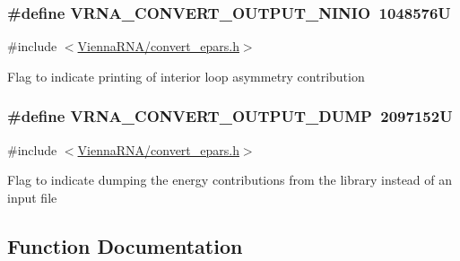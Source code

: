 \subsubsection[{V\+R\+N\+A\+\_\+\+C\+O\+N\+V\+E\+R\+T\+\_\+\+O\+U\+T\+P\+U\+T\+\_\+\+N\+I\+N\+I\+O}]{\setlength{\rightskip}{0pt plus 5cm}\#define V\+R\+N\+A\+\_\+\+C\+O\+N\+V\+E\+R\+T\+\_\+\+O\+U\+T\+P\+U\+T\+\_\+\+N\+I\+N\+I\+O~1048576\+U}\label{group__energy__parameters__convert_ga2eb0462f16939ddacdaf751a88d675ce}


{\ttfamily \#include $<$\hyperlink{convert__epars_8h}{Vienna\+R\+N\+A/convert\+\_\+epars.\+h}$>$}

Flag to indicate printing of interior loop asymmetry contribution \hypertarget{group__energy__parameters__convert_gac86976e9c2a55b3a6481ea60044f6098}{}
\subsubsection[{V\+R\+N\+A\+\_\+\+C\+O\+N\+V\+E\+R\+T\+\_\+\+O\+U\+T\+P\+U\+T\+\_\+\+D\+U\+M\+P}]{\setlength{\rightskip}{0pt plus 5cm}\#define V\+R\+N\+A\+\_\+\+C\+O\+N\+V\+E\+R\+T\+\_\+\+O\+U\+T\+P\+U\+T\+\_\+\+D\+U\+M\+P~2097152\+U}\label{group__energy__parameters__convert_gac86976e9c2a55b3a6481ea60044f6098}


{\ttfamily \#include $<$\hyperlink{convert__epars_8h}{Vienna\+R\+N\+A/convert\+\_\+epars.\+h}$>$}

Flag to indicate dumping the energy contributions from the library instead of an input file 

\subsection{Function Documentation}
\hypertarget{group__energy__parameters__convert_gafbe538bc4eb2cf2a33326e1010005f8a}{}
